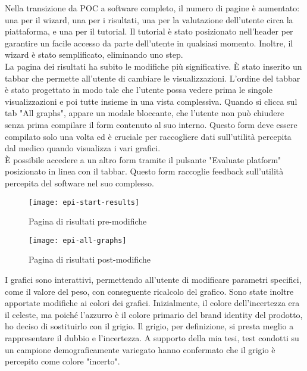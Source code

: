Nella transizione da POC a software completo, il numero di pagine è aumentato: una per il wizard, una per i risultati, una per la valutazione dell'utente circa la piattaforma, e una per il tutorial. Il tutorial è stato posizionato nell'header per garantire un facile accesso da parte dell'utente in qualsiasi momento. Inoltre, il wizard è stato semplificato, eliminando uno step.\\

La pagina dei risultati ha subito le modifiche più significative. È stato inserito un tabbar che permette all'utente di cambiare le visualizzazioni. L'ordine del tabbar è stato progettato in modo tale che l'utente possa vedere prima le singole visualizzazioni e poi tutte insieme in una vista complessiva. Quando si clicca sul tab "All graphs", appare un modale bloccante, che l'utente non può chiudere senza prima compilare il form contenuto al suo interno. Questo form deve essere compilato solo una volta ed è cruciale per raccogliere dati sull'utilità percepita dal medico quando visualizza i vari grafici.\\
È possibile accedere a un altro form tramite il pulsante "Evaluate platform" posizionato in linea con il tabbar. Questo form raccoglie feedback sull'utilità percepita del software nel suo complesso.\\

\begin{figure}[!ht] 
    \centering 
    \texttt{[image: epi-start-results]} 
    \caption{Pagina di risultati pre-modifiche}
\end{figure}

\begin{figure}[!ht] 
    \centering 
    \texttt{[image: epi-all-graphs]} 
    \caption{Pagina di risultati post-modifiche}
\end{figure}

I grafici sono interattivi, permettendo all'utente di modificare parametri specifici, come il valore del peso, con conseguente ricalcolo del grafico. Sono state inoltre apportate modifiche ai colori dei grafici. Inizialmente, il colore dell'incertezza era il celeste, ma poiché l'azzurro è il colore primario del brand identity del prodotto, ho deciso di sostituirlo con il grigio. Il grigio, per definizione, si presta meglio a rappresentare il dubbio e l'incertezza. A supporto della mia tesi, test condotti su un campione demograficamente variegato hanno confermato che il grigio è percepito come colore "incerto".\\

